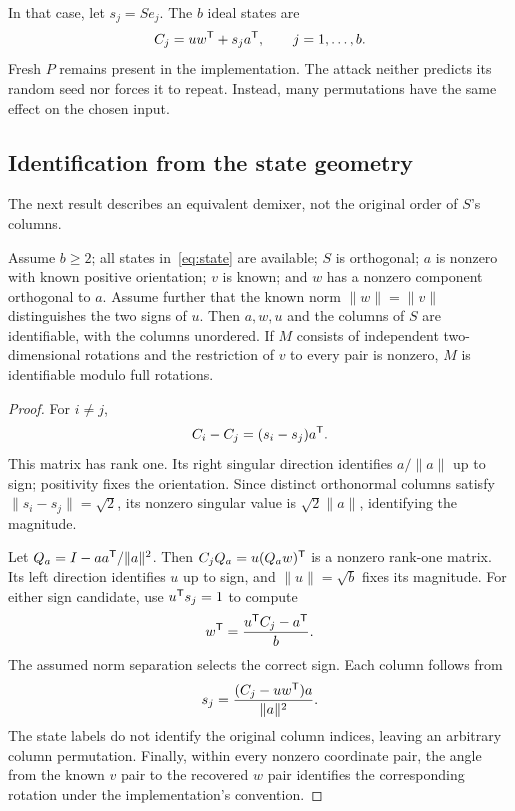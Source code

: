 In that case, let $s_j=Se_j$. The $b$ ideal states are
\begin{equation}
 C_j=uw^{\mathsf{T}}+s_j a^{\mathsf{T}},\qquad j=1,\ldots,b.
 \label{eq:state}
\end{equation}
Fresh $P$ remains present in the implementation. The attack neither predicts its random seed nor forces it to repeat. Instead, many permutations have the same effect on the chosen input.

\subsection{Identification from the state geometry}
The next result describes an equivalent demixer, not the original order of $S$'s columns.

\begin{theorem}
\label{thm:identification}
Assume $b\ge2$; all states in~\eqref{eq:state} are available; $S$ is orthogonal; $a$ is nonzero with known positive orientation; $v$ is known; and $w$ has a nonzero component orthogonal to $a$. Assume further that the known norm $\|w\|=\|v\|$ distinguishes the two signs of $u$. Then $a,w,u$ and the columns of $S$ are identifiable, with the columns unordered. If $M$ consists of independent two-dimensional rotations and the restriction of $v$ to every pair is nonzero, $M$ is identifiable modulo full rotations.
\end{theorem}
\begin{proof}
For $i\ne j$,
\begin{equation}
 C_i-C_j=(s_i-s_j)a^{\mathsf{T}}.
 \label{eq:rankone}
\end{equation}
This matrix has rank one. Its right singular direction identifies $a/\|a\|$ up to sign; positivity fixes the orientation. Since distinct orthonormal columns satisfy $\|s_i-s_j\|=\sqrt2$, its nonzero singular value is $\sqrt2\|a\|$, identifying the magnitude.

Let $Q_a=I-aa^{\mathsf{T}}/\|a\|^2$. Then $C_jQ_a=u(Q_aw)^{\mathsf{T}}$ is a nonzero rank-one matrix. Its left direction identifies $u$ up to sign, and $\|u\|=\sqrt b$ fixes its magnitude. For either sign candidate, use $u^{\mathsf{T}} s_j=1$ to compute
\begin{equation}
 w^{\mathsf{T}}=\frac{u^{\mathsf{T}} C_j-a^{\mathsf{T}}}{b}.
 \label{eq:w}
\end{equation}
The assumed norm separation selects the correct sign. Each column follows from
\begin{equation}
 s_j=\frac{(C_j-uw^{\mathsf{T}})a}{\|a\|^2}.
 \label{eq:s}
\end{equation}
The state labels do not identify the original column indices, leaving an arbitrary column permutation. Finally, within every nonzero coordinate pair, the angle from the known $v$ pair to the recovered $w$ pair identifies the corresponding rotation under the implementation's convention.
\end{proof}

